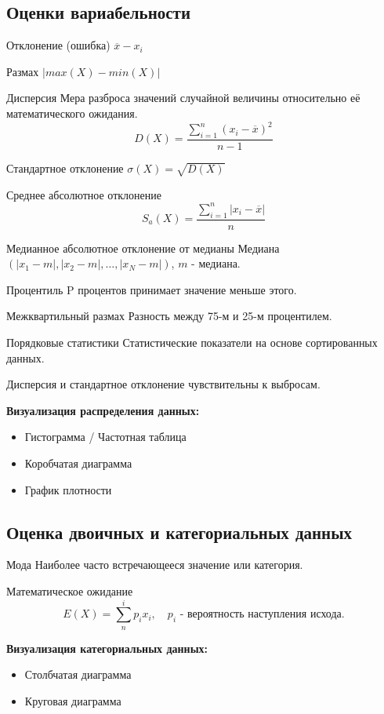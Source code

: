 \subsection{Оценки вариабельности}
\begin{terms}
    \item[Отклонение (ошибка)] $\overline{x} - x_i$
    \item[Размах] $|max(X) - min(X)|$
    \item[Дисперсия]
    Мера разброса значений случайной величины относительно её математического ожидания.
    \begin{equation*}
        D(X) = \frac{\sum_{i=1}^n (x_i - \overline{x})^2}{n - 1}
    \end{equation*}
    \item[Стандартное отклонение]
    $\sigma(X) = \sqrt{D(X)}$
    \item[Среднее абсолютное отклонение]
    \begin{equation*}
        S_a(X) = \frac{\sum_{i=1}^n |x_i - \overline{x}|}{n}
    \end{equation*}
    \item[Медианное абсолютное отклонение от медианы]
    Медиана$(|x_1-m|, |x_2-m|, \ldots, |x_N-m|)$, $m$ - медиана.
    \item[Процентиль] P процентов принимает значение меньше этого.
    \item[Межквартильный размах] Разность между 75-м и 25-м процентилем.
    \\\hline
    \item[Порядковые статистики] Статистические показатели на основе сортированных данных.
\end{terms}
Дисперсия и стандартное отклонение чувствительны к выбросам.
\par \textbf{Визуализация распределения данных:}
\begin{itemize}
    \item Гистограмма / Частотная таблица
    \item Коробчатая диаграмма
    \item График плотности
\end{itemize}

\subsection{Оценка двоичных и категориальных данных}
\begin{terms}
    \item[Мода] Наиболее часто встречающееся значение или категория.
    \item[Математическое ожидание]
    \begin{equation*}
        E(X) = \sum_{n}^{i} p_i x_i, \quad
        \text{$p_i$ - вероятность наступления исхода.}
    \end{equation*}
\end{terms}
\textbf{Визуализация категориальных данных:}
\begin{itemize}
    \item Столбчатая диаграмма
    \item Круговая диаграмма
\end{itemize}

